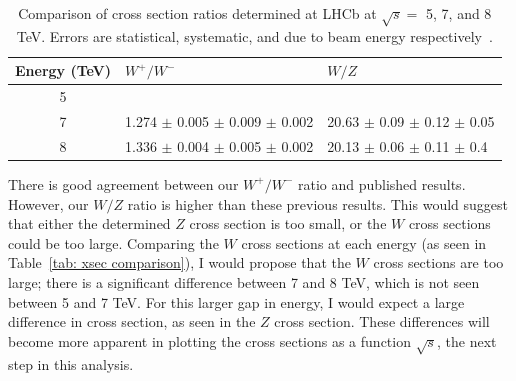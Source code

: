 \documentclass[a4paper]{article}
\begin{document}
\begin{table}[]
    \centering
    \begin{tabular}{c|ll}
        \hline
         Energy (TeV)   & $W^+/W^-$ & $W/Z$  \\
        \hline
         5              &   &   \\
         7              & 1.274 $\pm$ 0.005 $\pm$ 0.009 $\pm$ 0.002 & 20.63 $\pm$ 0.09 $\pm$ 0.12 $\pm$ 0.05  \\
         8              & 1.336 $\pm$ 0.004 $\pm$ 0.005 $\pm$ 0.002 & 20.13 $\pm$ 0.06 $\pm$ 0.11 $\pm$ 0.4   \\
         \hline
    \end{tabular}
    \caption{\small Comparison of cross section ratios determined at LHCb at $\sqrt{s} =$ 5, 7, and 8 TeV. Errors are statistical, systematic, and due to beam energy respectively~\cite{7TeV_W_2014,7TeV_Z_2015,8TeV_W+Z_2015}.}
    \label{tab: ratio comparison}
\end{table}

There is good agreement between our $W^+/W^-$ ratio and published results. However, our $W/Z$ ratio is higher than these previous results. This would suggest that either the determined $Z$ cross section is too small, or the $W$ cross sections could be too large. Comparing the $W$ cross sections at each energy (as seen in Table~\ref{tab: xsec comparison}), I would propose that the $W$ cross sections are too large; there is a significant difference between 7 and 8 TeV, which is not seen between 5 and 7 TeV. For this larger gap in energy, I would expect a large difference in cross section, as seen in the $Z$ cross section. These differences will become more apparent in plotting the cross sections as a function $\sqrt{s}$, the next step in this analysis.
\end{document}

